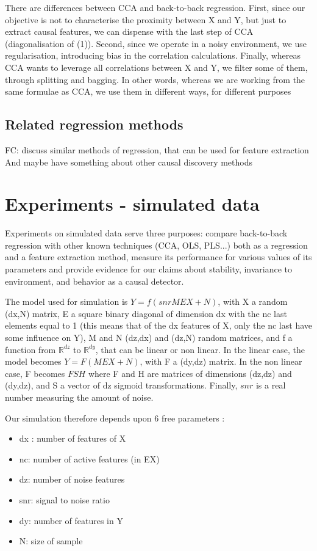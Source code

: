 \documentclass{article}
\begin{document}
There are differences between CCA and back-to-back regression.
%
First, since our objective is not to characterise the proximity between X and Y, but just to extract causal features, we can dispense with the last step of CCA (diagonalisation of (1)).
%
Second, since we operate in a noisy environment, we use regularisation, introducing bias in the correlation calculations.
%
Finally, whereas CCA wants to leverage all correlations between X and Y, we filter some of them, through splitting and bagging.
%
In other words, whereas we are working from the same formulae as CCA, we use them in different ways, for different purposes

\subsection{Related regression methods}
FC: discuss similar methods of regression, that can be used for feature extraction
And maybe have something about other causal discovery methods

\section{Experiments - simulated data}
Experiments on simulated data serve three purposes: compare back-to-back regression with other known techniques (CCA, OLS, PLS...) both as a regression and a feature extraction method, measure its performance for various values of its parameters and provide evidence for our claims about stability, invariance to environment, and behavior as a causal detector.

The model used for simulation is $Y=f(snr MEX+N)$, with X a random (dx,N) matrix, E a square binary diagonal of dimension dx with the nc last elements equal to 1 (this means that of the dx features of X, only the nc last have some influence on Y), M and N (dz,dx) and (dz,N) random matrices, and f a function from $\mathbb{R}^{dz}$ to $\mathbb{R}^{dy}$, that can be linear or non linear.
%
In the linear case, the model becomes $Y=F(MEX+N)$, with F a (dy,dz) matrix.
%
In the non linear case, F becomes $FSH$ where F and H are matrices of dimensions (dz,dz) and (dy,dz), and S a vector of dz sigmoid transformations.
%
Finally, $snr$ is a real number measuring the amount of noise.

Our simulation therefore depends upon 6 free parameters :
\begin{itemize}
\item dx : number of features of X
\item nc: number of active features (in EX)
\item dz: number of noise features
\item snr: signal to noise ratio
\item dy: number of features in Y
\item N: size of sample
\end{itemize}
\end{document}

